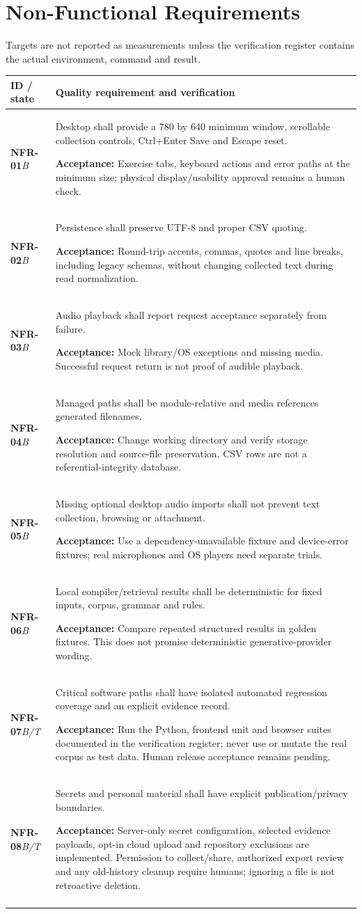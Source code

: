 \documentclass[11pt,a4paper]{article}
\newcommand{\requirement}[4]{\textbf{#1}\newline\textit{#2} & #3\par\smallskip\textbf{Acceptance:} #4\\\addlinespace}
\begin{document}
\section{Non-Functional Requirements}
Targets are not reported as measurements unless the verification register
contains the actual environment, command and result.
\begin{longtable}{L{1.8cm}L{12.5cm}}
\toprule\textbf{ID / state} & \textbf{Quality requirement and verification}\\\midrule\endhead
\requirement{NFR-01}{B}
{Desktop shall provide a 780 by 640 minimum window, scrollable collection controls, Ctrl+Enter Save and Escape reset.}
{Exercise tabs, keyboard actions and error paths at the minimum size; physical display/usability approval remains a human check.}
\requirement{NFR-02}{B}
{Persistence shall preserve UTF-8 and proper CSV quoting.}
{Round-trip accents, commas, quotes and line breaks, including legacy schemas, without changing collected text during read normalization.}
\requirement{NFR-03}{B}
{Audio playback shall report request acceptance separately from failure.}
{Mock library/OS exceptions and missing media. Successful request return is not proof of audible playback.}
\requirement{NFR-04}{B}
{Managed paths shall be module-relative and media references generated filenames.}
{Change working directory and verify storage resolution and source-file preservation. CSV rows are not a referential-integrity database.}
\requirement{NFR-05}{B}
{Missing optional desktop audio imports shall not prevent text collection, browsing or attachment.}
{Use a dependency-unavailable fixture and device-error fixtures; real microphones and OS players need separate trials.}
\requirement{NFR-06}{B}
{Local compiler/retrieval results shall be deterministic for fixed inputs, corpus, grammar and rules.}
{Compare repeated structured results in golden fixtures. This does not promise deterministic generative-provider wording.}
\requirement{NFR-07}{B/T}
{Critical software paths shall have isolated automated regression coverage and an explicit evidence record.}
{Run the Python, frontend unit and browser suites documented in the verification register; never use or mutate the real corpus as test data. Human release acceptance remains pending.}
\requirement{NFR-08}{B/T}
{Secrets and personal material shall have explicit publication/privacy boundaries.}
{Server-only secret configuration, selected evidence payloads, opt-in cloud upload and repository exclusions are implemented. Permission to collect/share, authorized export review and any old-history cleanup require humans; ignoring a file is not retroactive deletion.}

\end{longtable}
\end{document}
